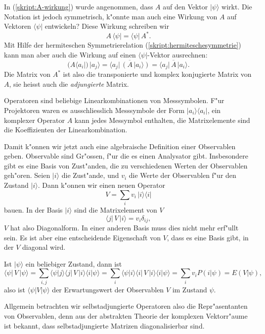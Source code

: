 In (\ref{skript:A-wirkung}) wurde angenommen, dass $A$ auf den Vektor
$|\psi\rangle$ wirkt. Die Notation ist jedoch symmetrisch, k"onnte
man auch eine Wirkung von $A$ auf Vektoren $\langle\psi|$ entwickeln?
Diese Wirkung schreiben wir
\[
A\,\langle \psi|=\langle\psi|\,A^*.
\]
Mit Hilfe der hermiteschen Symmetrierelation (\ref{skript:hermiteschesymmetrie})
kann man aber auch die Wirkung auf einen $\langle\psi|$-Vektor ausrechnen:
\begin{equation}
(A\langle a_i|)\,|a_j\rangle
=
\overline{\langle a_j|\,(A\,|a_i\rangle)}
=
\overline{\langle a_j|\,A\,|a_i\rangle}.
\end{equation}
Die Matrix von $A^*$
ist also die transponierte und komplex konjugierte Matrix von $A$,
sie heisst auch die {\em adjungierte} Matrix.
%
%

Operatoren sind beliebige Linearkombinationen von Messsymbolen.
F"ur Projektoren waren es ausschliesslich Messsymbole der Form
$|a_i\rangle\langle a_i|$, ein komplexer Operator $A$ kann jedes
Messymbol enthalten, die Matrixelemente sind die Koeffizienten 
der Linearkombination.

Damit k"onnen wir jetzt auch eine algebraische Definition einer
Observablen geben. Observable sind Gr"ossen, f"ur die es einen
Analysator gibt. Insbesondere gibt es eine Basis von Zust"anden,
die zu verschiedenen Werten der Observablen geh"oren.
Seien $|i\rangle$ die Zust"ande, und $v_i$ die Werte der Observablen
f"ur den Zustand $|i\rangle$. Dann k"onnen wir einen neuen
Operator
\[
V = \sum_{i} v_i\, |i\rangle\langle i|
\]
bauen. In der Basis $|i\rangle$ sind die Matrixelement von $V$
\[
\langle j|\,V\,|i\rangle = v_i\delta_{ij},
\]
$V$ hat also Diagonalform. In einer anderen Basis muss dies nicht
mehr erf"ullt sein. Es ist aber eine entscheidende Eigenschaft 
von $V$, dass es eine Basis gibt, in der $V$ diagonal wird.

Ist $|\psi\rangle$ ein beliebiger Zustand, dann ist
\[
\langle\psi|\,V\,|\psi\rangle
=
\sum_{i,j}\langle \psi|j\rangle\langle j|\,V\,|i\rangle\langle i|\psi\rangle
=
\sum_i\langle \psi|i\rangle\langle i|\,V\,|i\rangle\langle i|\psi\rangle
=
\sum_i v_i P(i|\psi)=E(V|\psi),
\]
also ist $\langle \psi|V|\psi\rangle$ der Erwartungswert der Observablen
$V$ im Zustand $\psi$.

Allgemein betrachten wir selbstadjungierte Operatoren also 
die Repr"asentanten von Observablen, denn aus der abstrakten
Theorie der komplexen Vektorr"aume ist bekannt, dass selbstadjungierte
Matrizen diagonalisierbar sind.

